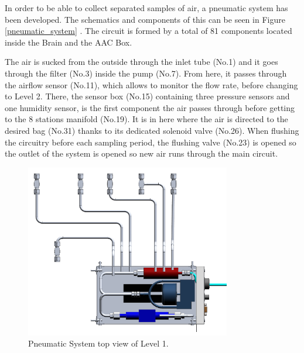 In order to be able to collect separated samples of air, a pneumatic system has been developed. The schematics and components of this can be seen in Figure \ref{pneumatic_system} . The circuit is formed by a total of 81 components located inside the Brain and the AAC Box. 


The air is sucked from the outside through the inlet tube (No.1) and it goes through the filter (No.3) inside the pump (No.7). From here, it passes through the airflow sensor (No.11), which allows to monitor the flow rate, before changing to Level 2. There, the sensor box (No.15) containing three pressure sensors and one humidity sensor, is the first component the air passes through before getting to the 8 stations manifold (No.19). It is in here where the air is directed to the desired bag (No.31) thanks to its dedicated solenoid valve (No.26). 
When flushing the circuitry before each sampling period, the flushing valve (No.23) is opened so the outlet of the system is opened so new air runs through the main circuit. 

\begin{figure}[H]
    \centering
    \includegraphics[width=0.8\textwidth]{4-experiment-design/img/Mechanical/Pneumatic_System_Top_View_Level_1.png}
    \caption{Pneumatic System top view of Level 1.}
    \label{level_1_pneumatic_system_top_view}
\end{figure}

